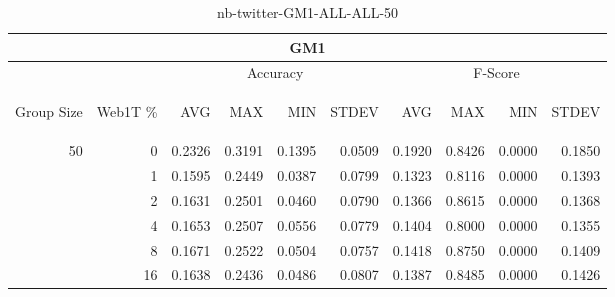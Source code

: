 \begin{center}
\begin{table}[htbp]
\begin{tabular}{ | r | r | r | r | r | r | r | r | r | r |}
\hline
\multicolumn{10}{|c|}{GM1}\\
\hline
 & & \multicolumn{4}{|c|}{Accuracy} & \multicolumn{4}{|c|}{F-Score}\\ \cline{3-10}
\begin{sideways}Group Size\end{sideways} & \begin{sideways}Web1T \%\end{sideways} & \begin{sideways}AVG\end{sideways} & \begin{sideways}MAX\end{sideways} & \begin{sideways}MIN\end{sideways} & \begin{sideways}STDEV\end{sideways} & \begin{sideways}AVG\end{sideways} & \begin{sideways}MAX\end{sideways} & \begin{sideways}MIN\end{sideways} & \begin{sideways}STDEV\end{sideways}\\
\hline
\multirow{5}{*}{50}
 & 0 & 0.2326 & 0.3191 & 0.1395 & 0.0509 & 0.1920 & 0.8426 & 0.0000 & 0.1850\\ \cline{2-10}
 & 1 & 0.1595 & 0.2449 & 0.0387 & 0.0799 & 0.1323 & 0.8116 & 0.0000 & 0.1393\\ \cline{2-10}
 & 2 & 0.1631 & 0.2501 & 0.0460 & 0.0790 & 0.1366 & 0.8615 & 0.0000 & 0.1368\\ \cline{2-10}
 & 4 & 0.1653 & 0.2507 & 0.0556 & 0.0779 & 0.1404 & 0.8000 & 0.0000 & 0.1355\\ \cline{2-10}
 & 8 & 0.1671 & 0.2522 & 0.0504 & 0.0757 & 0.1418 & 0.8750 & 0.0000 & 0.1409\\ \cline{2-10}
 & 16 & 0.1638 & 0.2436 & 0.0486 & 0.0807 & 0.1387 & 0.8485 & 0.0000 & 0.1426\\ \cline{2-10}
\hline
\end{tabular}
\caption{nb-twitter-GM1-ALL-ALL-50}
\label{table:nb-twitter-GM1-ALL-ALL-50}
\end{table}
\end{center}

